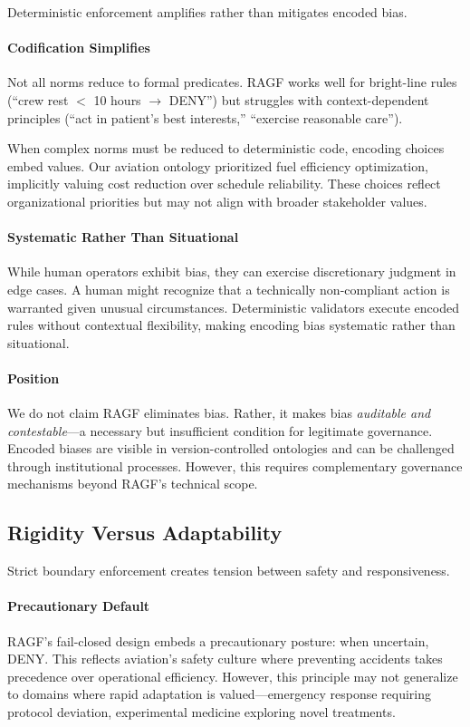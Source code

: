 \documentclass[sigconf,nonacm]{acmart}
\begin{document}
Deterministic enforcement amplifies rather than mitigates encoded bias.

\paragraph{Codification Simplifies} Not all norms reduce to formal predicates. RAGF works well for bright-line rules (``crew rest $<$ 10 hours $\rightarrow$ DENY'') but struggles with context-dependent principles (``act in patient's best interests,'' ``exercise reasonable care'').

When complex norms must be reduced to deterministic code, encoding choices embed values. Our aviation ontology prioritized fuel efficiency optimization, implicitly valuing cost reduction over schedule reliability. These choices reflect organizational priorities but may not align with broader stakeholder values.

\paragraph{Systematic Rather Than Situational} While human operators exhibit bias, they can exercise discretionary judgment in edge cases. A human might recognize that a technically non-compliant action is warranted given unusual circumstances. Deterministic validators execute encoded rules without contextual flexibility, making encoding bias systematic rather than situational.

\paragraph{Position} We do not claim RAGF eliminates bias. Rather, it makes bias \emph{auditable and contestable}---a necessary but insufficient condition for legitimate governance. Encoded biases are visible in version-controlled ontologies and can be challenged through institutional processes. However, this requires complementary governance mechanisms beyond RAGF's technical scope.

\subsection{Rigidity Versus Adaptability}

Strict boundary enforcement creates tension between safety and responsiveness.

\paragraph{Precautionary Default} RAGF's fail-closed design embeds a precautionary posture: when uncertain, DENY. This reflects aviation's safety culture where preventing accidents takes precedence over operational efficiency. However, this principle may not generalize to domains where rapid adaptation is valued---emergency response requiring protocol deviation, experimental medicine exploring novel treatments.
\end{document}
